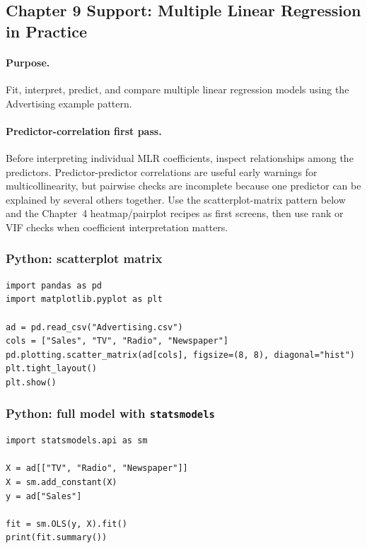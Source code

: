 \subsection{Chapter 9 Support: Multiple Linear Regression in Practice}
\label{app:ch09-software-cookbook-multiple-linear-regression-in-practice}

\paragraph{Purpose.} Fit, interpret, predict, and compare multiple linear regression models using the Advertising example pattern.

\paragraph{Predictor-correlation first pass.} Before interpreting individual MLR coefficients, inspect relationships among the predictors.  Predictor-predictor correlations are useful early warnings for multicollinearity, but pairwise checks are incomplete because one predictor can be explained by several others together.  Use the scatterplot-matrix pattern below and the Chapter~4 heatmap/pairplot recipes as first screens, then use rank or VIF checks when coefficient interpretation matters.

\subsubsection*{Python: scatterplot matrix}

\begin{verbatim}
import pandas as pd
import matplotlib.pyplot as plt

ad = pd.read_csv("Advertising.csv")
cols = ["Sales", "TV", "Radio", "Newspaper"]
pd.plotting.scatter_matrix(ad[cols], figsize=(8, 8), diagonal="hist")
plt.tight_layout()
plt.show()
\end{verbatim}

\subsubsection*{Python: full model with \texttt{statsmodels}}

\begin{verbatim}
import statsmodels.api as sm

X = ad[["TV", "Radio", "Newspaper"]]
X = sm.add_constant(X)
y = ad["Sales"]

fit = sm.OLS(y, X).fit()
print(fit.summary())
\end{verbatim}

